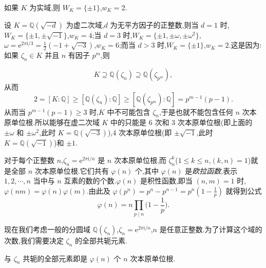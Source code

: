 \begin{example}\label{ex:ch1-1-5}
如果 $K$ 为实域,则 $W_K=\{\pm1\}$,$w_K=2$.
\end{example}

\begin{example}\label{ex:ch1-1-6}
\begin{sloppypar}
设 $K=\mathbb{Q}(\sqrt{-d})$ 为虚二次域,$d$ 为无平方因子的正整数,则当 $d=1$ 时,$W_K=\{\pm1,\pm\sqrt{-1}\}$,$w_K=4$;当 $d=3$ 时,$W_K=\{\pm1,\pm\omega,\pm\omega^2\}$,$\omega=\mathrm{e}^{2\pi\mathrm{i}/3}=\frac{1}{2}(-1+\sqrt{-3})$,$w_K=6$;而当 $d>3$ 时,$W_K=\{\pm1\}$,$w_K=2$.这是因为:如果 $\zeta_n\in K$ 并且 $n$ 有因子 $p^m$,则
\end{sloppypar}
\[
  K\supseteq\mathbb{Q}(\zeta_n)\supseteq\mathbb{Q}(\zeta_{p^m}),
\]
从而
\[
  2=[K:\mathbb{Q}]\geqslant[\mathbb{Q}(\zeta_n):\mathbb{Q}]\geqslant[\mathbb{Q}(\zeta_{p^m}):\mathbb{Q}]=p^{m-1}(p-1).
\]
从而当 $p^{m-1}(p-1)\geqslant 3$ 时,$K$ 中不可能包含 $\zeta_n$,于是也就不能包含任何 $n$ 次本原单位根.所以能够在虚二次域 $K$ 中的只能是 $6$ 次和 $3$ 次本原单位根(即上面的 $\pm\omega$ 和 $\pm\omega^2$,此时 $K=\mathbb{Q}(\sqrt{-3})$),$4$ 次本原单位根(即 $\pm\sqrt{-1}$,此时 $K=\mathbb{Q}(\sqrt{-1})$)和 $\pm1$.
\end{example}

对于每个正整数 $n$,$\zeta_n=\mathrm{e}^{2\pi\mathrm{i}/n}$ 是 $n$ 次本原单位根,而 $\zeta_n^k$($1\leqslant k\leqslant n$,$(k,n)=1$)就是全部 $n$ 次本原单位根.它们共有 $\varphi(n)$ 个,其中 $\varphi(n)$ 是\emph{欧拉函数},表示 $1,2,\cdots,n$ 当中与 $n$ 互素的数的个数.$\varphi(n)$ 是积性函数,即当 $(n,m)=1$ 时,$\varphi(nm)=\varphi(n)\varphi(m)$.由此及 $\varphi(p^n)=p^n-p^{n-1}=p^n(1-\frac{1}{p})$ 就得到公式
\[
  \varphi(n)=n\prod_{p\mid n}\Big(1-\frac{1}{p}\Big).
\]

现在我们考虑一般的分圆域 $\mathbb{Q}(\zeta_n)$,$\zeta_n=\mathrm{e}^{2\pi\mathrm{i}/n}$,$n$ 是任意正整数.为了计算这个域的次数,我们需要决定 $\zeta_n$ 的全部共轭元素.

\begin{lemma}\label{lem:ch1-6}
与 $\zeta_n$ 共轭的全部元素即是 $\varphi(n)$ 个 $n$ 次本原单位根.
\end{lemma}

